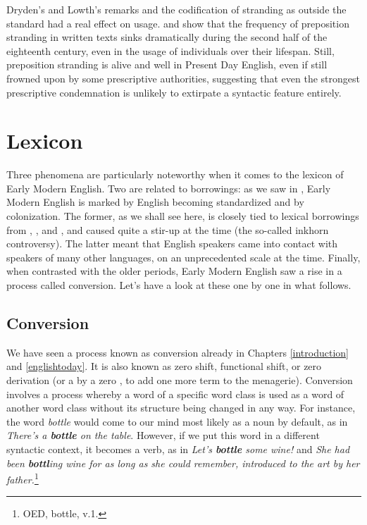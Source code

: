 Dryden's and Lowth's remarks and the codification of stranding as outside the standard had a real effect on usage. \citet[chapter 4]{YanezBouza2015} and \citet{Sairio2009} show that the frequency of preposition stranding in written texts sinks dramatically during the second half of the eighteenth century, even in the usage of individuals over their lifespan. Still, preposition stranding is alive and well in Present Day English, even if still frowned upon by some prescriptive authorities, suggesting that even the strongest prescriptive condemnation is unlikely to extirpate a syntactic feature entirely.

\section{Lexicon}\label{EModE-lexicon}
Three phenomena are particularly noteworthy when it comes to the lexicon of Early Modern English. Two are related to borrowings: as we saw in , Early Modern English is marked by English becoming standardized and by colonization. The former, as we shall see here, is closely tied to lexical borrowings from , , and , and caused quite a stir-up at the time (the so-called inkhorn controversy). The latter meant that English speakers came into contact with speakers of many other languages, on an unprecedented scale at the time. Finally, when contrasted with the older periods, Early Modern English saw a rise in a  process called conversion. Let's have a look at these one by one in what follows.


\subsection{Conversion}\label{EModE-conversion}
\largerpage[2]
We have seen a process known as conversion already in Chapters \ref{introduction} and \ref{englishtoday}. It is also known as zero shift, functional shift, or zero derivation (or a  by a zero , to add one more term to the menagerie). Conversion involves a process whereby a word of a specific word class is used as a word of another word class without its structure being changed in any way. For instance, the word
\textit{bottle} would come to our mind most likely as a noun by default, as in \textit{There's a \textbf{bottle} on the table}. However, if we put this word in a different syntactic context, it becomes a verb, as in {\textit{Let's \textbf{bottle} some wine!}} and \textit{She had been \textbf{bottl}ing wine for as long as she could remember, introduced to the art by her father.}\footnote{OED,  bottle, v.1.}

